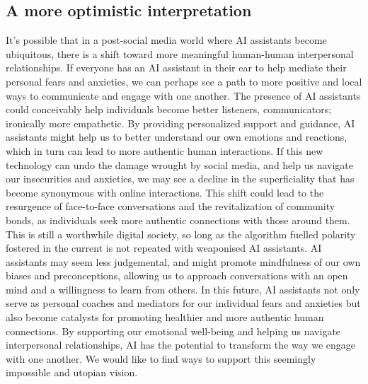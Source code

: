 \subsection{A more optimistic interpretation}
It's possible that in a post-social media world where AI assistants become ubiquitous, there is a shift toward more meaningful human-human interpersonal relationships. If everyone has an AI assistant in their ear to help mediate their personal fears and anxieties, we can perhaps see a path to more positive and local ways to communicate and engage with one another. The presence of AI assistants could conceivably help individuals become better listeners, communicators; ironically more empathetic. By providing personalized support and guidance, AI assistants might help us to better understand our own emotions and reactions, which in turn can lead to more authentic human interactions. If this new technology can undo the damage wrought by social media, and help us navigate our insecurities and anxieties, we may see a decline in the superficiality that has become synonymous with online interactions. This shift could lead to the resurgence of face-to-face conversations and the revitalization of community bonds, as individuals seek more authentic connections with those around them. This is still a worthwhile digital society, so long as the algorithm fuelled polarity fostered in the current is not repeated with weaponised AI assistants. AI assistants may seem less judgemental, and might promote mindfulness of our own biases and preconceptions, allowing us to approach conversations with an open mind and a willingness to learn from others. In this future, AI assistants not only serve as personal coaches and mediators for our individual fears and anxieties but also become catalysts for promoting healthier and more authentic human connections. By supporting our emotional well-being and helping us navigate interpersonal relationships, AI has the potential to transform the way we engage with one another. We would like to find ways to support this seemingly impossible and utopian vision.
\newpage
